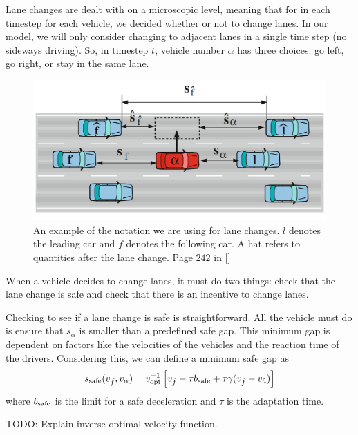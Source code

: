 \documentclass[12pt]{article}
\begin{document}
   Lane changes are dealt with on a microscopic level, meaning that for in each timestep for each vehicle, we decided whether or not to change lanes.  In our model, we will only consider changing to adjacent lanes in a single time step (no sideways driving). So, in timestep $t$, vehicle number $\alpha$ has three choices: go left, go right, or stay in the same lane.

      \begin{figure}[H]
        \begin{center}
          \includegraphics{lane_change_diagram.PNG}
        \end{center}
        \caption{An example of the notation we are using for lane changes. $l$ denotes the leading car and $f$ denotes the following car. A hat refers to quantities after the lane change. Page $242$ in [\cite{traffic}]}
      \end{figure}

      When a vehicle decides to change lanes, it must do two things: check that the lane change is safe and check that there is an incentive to change lanes.

      Checking to see if a lane change is safe is straightforward. All the vehicle must do is ensure that $s_{\alpha}$ is smaller than a predefined safe gap. This minimum gap is dependent on factors like the velocities of the vehicles and the reaction time of the drivers. 
      Considering this, we can define a minimum safe gap as 
      \begin{equation}
        s_{\rm safe} (v_{\hat f}, v_{\alpha}) = v_{\rm opt}^{-1} \left[v_{\hat f} -\tau b_{\rm safe} + \tau \gamma (v_{\hat f} - v_{\hat a}) \right]
      \end{equation}
      where $b_{\rm safe}$ is the limit for a safe deceleration and $\tau$ is the adaptation time. 

      TODO: Explain inverse optimal velocity function.
\end{document}
